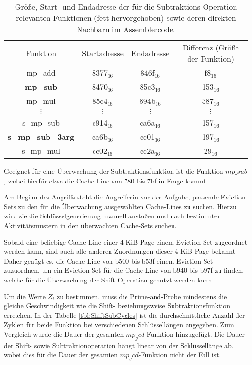 \begin{table}[h]
\caption{Größe, Start- und Endadresse der für die Subtraktions-Operation relevanten Funktionen (fett hervorgehoben) sowie deren direkten Nachbarn im Assemblercode.}
\label{tbl:assOffsetSub}
\begin{tabular}{cccc}
Funktion         & Startadresse & Endadresse & Differenz (Größe der Funktion) \\[10pt]
mp\_add & 8377$_{16}$ & 846f$_{16}$ & f8$_{16}$\\
\textbf{mp\_sub} & 8470$_{16}$ & 85c3$_{16}$ & 153$_{16}$ \\
mp\_mul & 85c4$_{16}$ & 894b$_{16}$ & 387$_{16}$ \\
$\vdots$               &  $\vdots$             &    $\vdots$         &     $\vdots$   \\
s\_mp\_sub       & c914$_{16}$         & ca6a$_{16}$       & 157$_{16}$   \\
\textbf{s\_mp\_sub\_3arg} & ca6b$_{16}$         & cc01$_{16}$       & 197$_{16}$   \\
s\_mp\_mul       & cc02$_{16}$         & cc2a$_{16}$       & 29$_{16}$   
\end{tabular}
\end{table}

Geeignet für eine Überwachung der Subtraktionsfunktion ist die Funktion $mp\_sub$, wobei hierfür etwa die Cache-Line von 780 bis 7bf in Frage kommt.

Am Beginn des Angriffs steht die Angreiferin vor der Aufgabe, passende Eviction-Sets zu den für die Überwachung ausgewählten Cache-Lines zu suchen.
Hierzu wird sie die Schlüsselgenerierung manuell anstoßen und nach bestimmten Aktivitätsmustern in den überwachten Cache-Sets suchen.

Sobald eine beliebige Cache-Line einer 4-KiB-Page einem Eviction-Set zugeordnet werden kann, sind auch alle anderen Zuordnungen dieser 4-KiB-Page bekannt.
Daher genügt es, die Cache-Line von b500 bis b53f einem Eviction-Set zuzuordnen, um ein Eviction-Set für die Cache-Line von b940 bis b97f zu finden, welche für die Überwachung der Shift-Operation genutzt werden kann.

Um die Werte $Z_i$ zu bestimmen, muss die Prime-and-Probe mindestens die gleiche Geschwindigkeit wie die Shift- beziehungsweise Subtraktionsfunktion erreichen.
In der Tabelle \ref{tbl:ShiftSubCycles} ist die durchschnittliche Anzahl der Zyklen für beide Funktion bei verschiedenen Schlüssellängen angegeben. Zum Vergleich wurde die Dauer der gesamten $mp_gcd$-Funktion hinzugefügt.
Die Dauer der Shift- sowie Subtraktionoperation hängt linear von der Schlüssellänge ab, wobei dies für die Dauer der gesamten $mp_gcd$-Funktion nicht der Fall ist.

